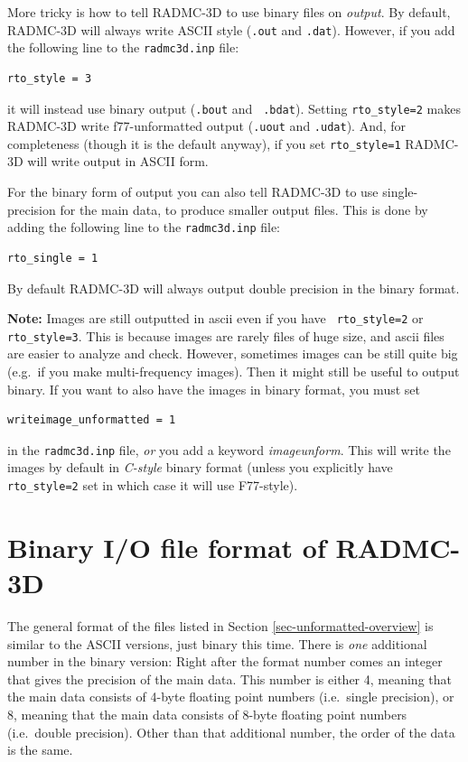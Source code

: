 \documentclass{report}
\newenvironment{asciibox}%
  {\begin{list}{}{%
    \setlength{\topsep}{0.5em}%
    \setlength{\parskip}{0em}%
    \setlength{\parsep}{0em}%
    \setlength{\itemsep}{0em}%
    \setlength{\rightmargin}{0em}%
    \setlength{\leftmargin}{3.0em}%
    \setlength{\labelsep}{1em}%
    \setlength{\labelwidth}{2em}%
  }\normalfont\footnotesize\item}
  {\end{list}}
\begin{document}
More tricky is how to tell RADMC-3D to use binary files on {\em output}. By 
default, RADMC-3D will always write ASCII style ({\small\tt .out} and
{\small\tt .dat}). However, if you add the following line to the 
{\small\tt radmc3d.inp} file:
\begin{asciibox}\begin{verbatim}
rto_style = 3
\end{verbatim}\end{asciibox}
it will instead use binary output ({\small\tt .bout} and {\small\tt
  .bdat}). Setting {\small\tt rto\_style=2} makes RADMC-3D write
f77-unformatted output ({\small\tt .uout} and {\small\tt .udat}).
And, for completeness (though it is the default anyway), if
you set {\small\tt rto\_style=1} RADMC-3D will write output in
ASCII form. 

For the binary form of output you can also tell RADMC-3D to use
single-precision for the main data, to produce smaller output
files. This is done by adding the following line to the 
{\small\tt radmc3d.inp} file:
\begin{asciibox}\begin{verbatim}
rto_single = 1
\end{verbatim}\end{asciibox}
By default RADMC-3D will always output double precision in the
binary format.

{\bf Note:} Images are still outputted in ascii even if you have {\small\tt
  rto\_style=2} or {\small\tt rto\_style=3}. This is because images are
rarely files of huge size, and ascii files are easier to analyze and
check. However, sometimes images can be still quite big (e.g.\ if you make
multi-frequency images). Then it might still be useful to output binary. If
you want to also have the images in binary format, you must set
\begin{asciibox}\begin{verbatim}
writeimage_unformatted = 1
\end{verbatim}\end{asciibox}
in the {\small\tt radmc3d.inp} file, {\em or} you add a keyword {\em
  imageunform}. This will write the images by default in {\em C-style}
binary format (unless you explicitly have {\small\tt rto\_style=2} set in
which case it will use F77-style).


\section{Binary I/O file format of RADMC-3D}
\label{sec-binary-io}
%
The general format of the files listed in Section
\ref{sec-unformatted-overview} is similar to the ASCII versions, just binary
this time. There is {\em one} additional number in the binary version: Right
after the format number comes an integer that gives the precision of the
main data. This number is either 4, meaning that the main data consists of
4-byte floating point numbers (i.e.\ single precision), or 8, meaning that
the main data consists of 8-byte floating point numbers (i.e.\ double
precision). Other than that additional number, the order of the data
is the same. 
\end{document}
